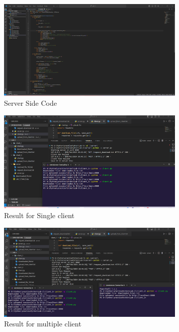 \documentclass[11pt]{article}
\begin{document}
\begin{itemize}
\begin{itemize}
    \begin{figure}[H]
        \centering
        \includegraphics[width=0.8\textwidth]{server2.png}
        \caption{Server Side Code}
        \label{fig:2}
    \end{figure}
    
    \begin{figure}[H]
      \centering
      \includegraphics[width=0.8\textwidth]{single_client_result.png}
      \caption{Result for Single client}
      \label{fig:3}
    \end{figure}
    
    \begin{figure}[H]
      \centering
      \includegraphics[width=0.8\textwidth]{multiple_client_result.png}
      \caption{Result for multiple client}
      \label{fig:4}
    \end{figure}


\end{itemize}
\end{itemize}
\end{document}
